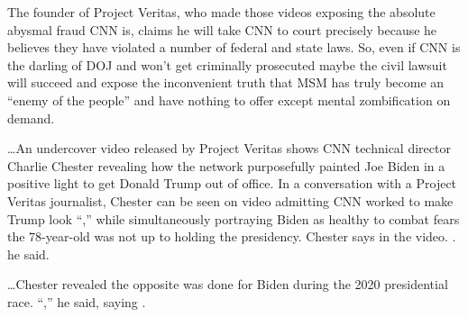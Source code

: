 \begin{refsection}
The founder of Project Veritas, who made those videos exposing the absolute abysmal fraud CNN is, claims he will take CNN to court precisely because he believes they have violated a number of federal and state laws. So, even if CNN is the darling of DOJ and won't get criminally prosecuted maybe the civil lawsuit will succeed and expose the inconvenient truth that MSM has truly become an \enquote{enemy of the people} and have nothing to offer except mental zombification on demand.

\begin{tcolorbox}[quote]

\dots{}An undercover video released by Project Veritas shows CNN technical director Charlie Chester revealing how the network purposefully painted Joe Biden in a positive light to get Donald Trump out of office. In a conversation with a Project Veritas journalist, Chester can be seen on video admitting CNN worked to make Trump look \enquote{,} while simultaneously portraying Biden as healthy to combat fears the 78-year-old was not up to holding the presidency.  Chester says in the video. .  he said.\textsuperscript{\cite{urlc980y1q3}}

\end{tcolorbox}

\begin{tcolorbox}[quote]

\dots{}Chester revealed the opposite was done for Biden during the 2020 presidential race. \enquote{,} he said, saying .\textsuperscript{\cite{urlc980y1q3}}

\end{tcolorbox}

\begin{tcolorbox}[quote]


\end{tcolorbox}
\end{refsection}
